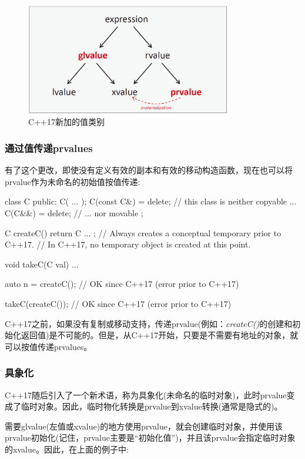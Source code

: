 \begin{figure}
	\includegraphics[width=0.8\textwidth]{part1/ch8/images/2}
	\caption{C++17新加的值类别}
\end{figure}

\subsubsection{通过值传递prvalues}

有了这个更改，即使没有定义有效的副本和有效的移动构造函数，现在也可以将prvalue作为未命名的初始值按值传递:

\begin{cppcode}
class C {
	public:
	C( ... );
	C(const C&) = delete; // this class is neither copyable ...
	C(C&&) = delete; // ... nor movable
};

C createC() {
	return C{ ... }; // Always creates a conceptual temporary prior to C++17.
} // In C++17, no temporary object is created at this point.

void takeC(C val) {
	...
}

auto n = createC(); // OK since C++17 (error prior to C++17)

takeC(createC()); // OK since C++17 (error prior to C++17)
\end{cppcode}

C++17之前，如果没有复制或移动支持，传递prvalue(例如：\textit{createC()}的创建和初始化返回值)是不可能的。但是，从C++17开始，只要是不需要有地址的对象，就可以按值传递prvalues。

\subsubsection{具象化}

C++17随后引入了一个新术语，称为具象化(未命名的临时对象)，此时prvalue变成了临时对象。因此，临时物化转换是prvalue到xvalue转换(通常是隐式的)。

需要glvalue(左值或xvalue)的地方使用prvalue，就会创建临时对象，并使用该prvalue初始化(记住，prvalue主要是“初始化值”)，并且该prvalue会指定临时对象的xvalue。因此，在上面的例子中:

